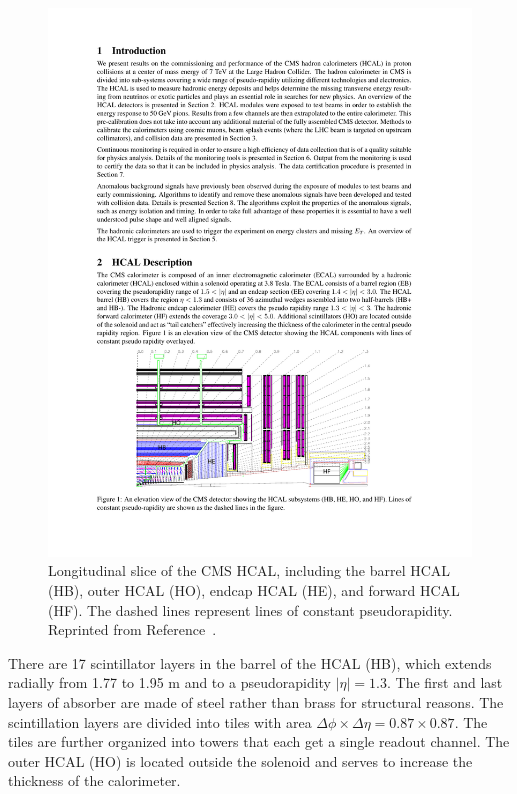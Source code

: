 
\begin{figure}[h!]
	\centering
	\includegraphics[width=\linewidth]{Figures/Detector/HCAL_layout.pdf}
       \caption[Longitudinal slice of the CMS HCAL.]{Longitudinal slice of the CMS HCAL, including the barrel HCAL (HB), outer HCAL (HO), endcap HCAL (HE), and forward HCAL (HF). The dashed lines represent lines of constant pseudorapidity. Reprinted from Reference~\cite{Chatrchyan2008zzk}.}
       \label{fig:HCAL_layout}
\end{figure}

There are 17 scintillator layers in the barrel of the HCAL (HB), which extends radially from 1.77 to 1.95 m and to a pseudorapidity $|\eta| = 1.3$. The first and last layers of absorber are made of steel rather than brass for structural reasons. The scintillation layers are divided into tiles with area $\Delta\phi \times \Delta\eta = 0.87 \times 0.87$. The tiles are further organized into towers that each get a single readout channel. The outer HCAL (HO) is located outside the solenoid and serves to increase the thickness of the calorimeter. 


